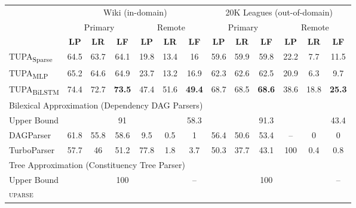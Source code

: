 \documentclass[a0,portrait]{a0poster}
\newcommand{\parser}[1]{TUPA\textsubscript{#1}}
\begin{document}
\begin{multicols}{2}
\begin{center}
	\begin{tabular}{l|ccc|ccc||ccc|ccc}
		& \multicolumn{6}{c||}{Wiki (in-domain)} & \multicolumn{6}{c}{20K Leagues (out-of-domain)} \\
		& \multicolumn{3}{c|}{Primary} & \multicolumn{3}{c||}{Remote}
		& \multicolumn{3}{c|}{Primary} & \multicolumn{3}{c}{Remote} \\
		& \textbf{LP} & \textbf{LR} & \textbf{LF} & \textbf{LP} & \textbf{LR} & \textbf{LF}
		& \textbf{LP} & \textbf{LR} & \textbf{LF} & \textbf{LP} & \textbf{LR} & \textbf{LF} \\
		\hline
		\parser{Sparse}
		& 64.5 & 63.7 & 64.1 & 19.8 & 13.4 & 16
		& 59.6 & 59.9 & 59.8 & 22.2 & 7.7 & 11.5 \\
		\parser{MLP}
		& 65.2 & 64.6 & 64.9 & 23.7 & 13.2 & 16.9
		& 62.3 & 62.6 & 62.5 & 20.9 & 6.3 & 9.7 \\
		\parser{BiLSTM}
		& 74.4 & 72.7 & \textbf{73.5} & 47.4 & 51.6 & \textbf{49.4}
		& 68.7 & 68.5 & \textbf{68.6} & 38.6 & 18.8 & \textbf{25.3} \\
		\hline
		\multicolumn{8}{l}{\rule{0pt}{2ex} \footnotesize
		Bilexical Approximation (Dependency DAG Parsers)} \\
		\small Upper Bound
		& & & \small 91 & & & \small 58.3
		& & & \small 91.3 & & & \small 43.4 \\
		DAGParser \cite{ribeyre-villemontedelaclergerie-seddah:2014:SemEval}
		& 61.8 & 55.8 & 58.6 & 9.5 & 0.5 & 1
		& 56.4 & 50.6 & 53.4 & -- & 0 & 0 \\
		TurboParser \cite{almeida-martins:2015:SemEval}
		& 57.7 & 46 & 51.2 & 77.8 & 1.8 & 3.7
		& 50.3 & 37.7 & 43.1 & 100 & 0.4 & 0.8 \\
		\hline
		\multicolumn{8}{l}{\rule{0pt}{2ex} \footnotesize
		Tree Approximation (Constituency Tree Parser)} \\
		\small Upper Bound
		& & & \small 100 & & & \small --
		& & & \small 100 & & & \small -- \\
		\textsc{uparse} \cite{maier-lichte:2016:DiscoNLP}

\end{tabular}
\end{center}
\end{multicols}
\end{document}
